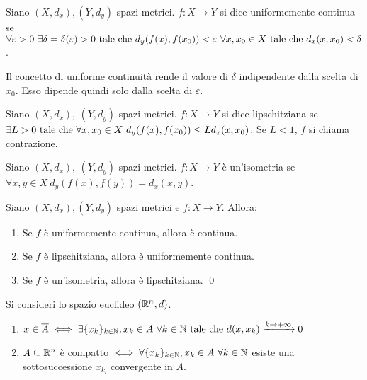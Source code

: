 \begin{definition}
    Siano $(X, d_x), (Y, d_y)$ spazi metrici. $f : X \to Y$ si dice uniformemente continua se $\forall \varepsilon > 0 \ \exists \delta = \delta (\varepsilon) > 0 \text{ tale che } d_y(f(x), f(x_0)) < \varepsilon \ \forall x,x_0 \in X \text{ tale che } d_x(x, x_0) < \delta$.
\end{definition}

\begin{remark}
    Il concetto di uniforme continuità rende il valore di $\delta$ indipendente dalla scelta di $x_0$. Esso dipende quindi solo dalla scelta di $\varepsilon$.
\end{remark}

\begin{definition}
    Siano $(X, d_x),\ (Y, d_y)$ spazi metrici. $f: X \to Y$ si dice lipschitziana se $\exists L > 0 \text{ tale che } \forall x, x_0 \in X \ d_y(f(x), f(x_0)) \leq Ld_x(x, x_0)$. Se $L<1$, $f$ si chiama contrazione.
\end{definition}

\begin{definition}
    [Isometria]
    Siano $(X, d_x),\ (Y, d_y)$ spazi metrici. $f: X \to Y$ è un'isometria se $\forall x, y \in X \ d_y(f(x), f(y)) = d_x(x,y)$.
\end{definition}

\begin{theorem}
    Siano $(X, d_x), (Y, d_y)$ spazi metrici e $f:X \to Y$. Allora:
    \begin{enumerate}
        \item Se $f$ è uniformemente continua, allora è continua.
        \item Se $f$ è lipschitziana, allora è uniformemente continua.
        \item Se $f$ è un'isometria, allora è lipschitziana.
        \qed
    \end{enumerate}
\end{theorem}

\begin{prop}
    Si consideri lo spazio euclideo $(\mathbb{R}^n,d)$.
    \begin{enumerate}
        \item $x \in \overline{A} \iff \exists \{x_k\}_{k\in \mathbb{N}}, x_k \in A \ \forall k \in \mathbb{N} \text{ tale che } d(x, x_k) \xrightarrow{k \to + \infty} 0$

        \item $A \subseteq \mathbb{R}^n$ è compatto $\iff \forall\{x_k\}_{k\in \N}, x_k \in A \ \forall k \in \N$ esiste una sottosuccessione $x_{k_l}$ convergente in $A$.
    \end{enumerate}
\end{prop}

